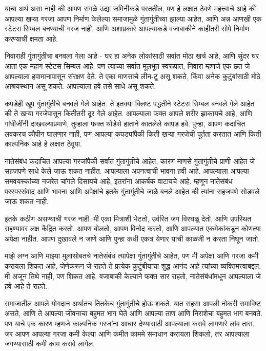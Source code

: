 याचा अर्थ असा नाही की आपण सगळे उद्या जमिनीकडे परततील, पण हे लक्षात ठेवणे महत्त्वाचे आहे की आपल्या खऱ्या गरजा आपण निर्माण केलेल्या समाजामुळे गुंतागुंतीच्या झाल्या आहेत, आणि अन्न आणखी एक स्टेटस सिम्बल बनण्याची गरज नाही. आणि अशाप्रकारे आपल्याकडे वजाबाकीने काहीतरी सोपे निर्माण करण्याची क्षमता आहे.

निवाराही गुंतागुंतीचा बनवला गेला आहे - घर हा अनेक लोकांसाठी सर्वात मोठा खर्च आहे, आणि सुंदर घर आता एक महाग स्टेटस सिम्बल आहे. पण त्याच्या सर्वात मूलभूत स्वरूपात, निवारा म्हणजे एक छत जे आपल्याला हवामानापासून संरक्षण देते. ते एका माणसाचे लीन-टू असू शकते, किंवा अनेक कुटुंबांसाठी मोठे आश्रयस्थान असू शकते. आपल्याला हवे तसे साधे असू शकते.

कपडेही खूप गुंतागुंतीचे बनवले गेले आहेत. ते इतक्या क्लिष्ट पद्धतीने स्टेटस सिम्बल बनवले गेले आहेत की ते खऱ्या गरजेपासून कितीतरी दूर गेले आहेत. आपल्याला फक्त आपले शरीर झाकायचे आहे, आणि गांधीजींनी दाखवल्याप्रमाणे, तुम्हाला फक्त थोडेसे हाताने कातलेले कापड हवे. पुन्हा, आपण कदाचित लवकरच कौपीन घालणार नाही, पण आपल्या कपड्यांपैकी किती खऱ्या गरजेची पूर्तता करतात आणि किती काल्पनिक आहे हे लक्षात ठेवूया.

नातेसंबंध कदाचित आपल्या गरजांपैकी सर्वात गुंतागुंतीचे आहेत, कारण माणसे गुंतागुंतीचे प्राणी आहेत जे सहजपणे साधे केले जाऊ शकत नाहीत. आपल्याला अपनत्वाची भावना हवी आहे. आपल्याला आपल्या समवयस्कांच्या नजरेत चांगले दिसायचे आहे, इतरांना आकर्षक वाटायचे आहे. म्हणून नातेसंबंध परस्परसंवाद आणि भावना आणि अपेक्षांचे इतके गुंतागुंतीचे जाळे बनले आहेत की त्यांना सहजपणे सोडवले जाऊ शकत नाही.

इतके कठीण असण्याची गरज नाही. मी एका मित्राशी भेटतो, उर्वरित जग विरघळू देतो, आणि उपस्थित राहण्यावर लक्ष केंद्रित करतो. आपण बोलतो, आपण विनोद करतो, आणि आपल्यात एकमेकांकडून कोणत्या अपेक्षा नाहीत. आपण दुखावले न जाणे आणि पुन्हा कधी एकत्र येणार याची काळजी न करता निघून जातो.

माझे लग्न आणि माझ्या मुलांसोबतचे नातेसंबंध त्यापेक्षा गुंतागुंतीचे आहेत, पण मी अपेक्षा आणि गरजा कमी करायला शिकत आहे, जेणेकरून जे राहते ते प्रत्येक कुटुंबीयाचा शुद्ध आनंद आहे त्यांच्या व्यक्तिमत्त्वाबद्दल. मी अजून तिथे नाही, पण शिकत आहे. वजाबाकी केल्याने फक्त सार राहतो, नातेसंबंधांमधून आपल्याला जे हवे आहे ते राहते.

समाजातील आपले योगदान अर्थातच तितकेच गुंतागुंतीचे होऊ शकते. यात सहसा आपली नोकरी समाविष्ट असते, आणि ते आपल्या जीवनाचा बहुमत भाग घेते आणि आपल्या ताण आणि निराशेचा बहुमत भाग बनवते. पण याचे एक कारण म्हणजे काल्पनिक गरजांना आधार देण्यासाठी आपल्याला करावे लागणारे लांब तास. जर आपण आपल्या गरजा कमी केल्या आणि कमीत काममे समाधान करायला शिकलो, तर आपल्याला जगण्यासाठी कमी काम करावे लागेल.

